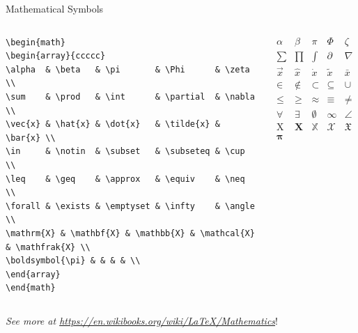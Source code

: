 \documentclass[aspectratio=1610]{beamer}
\let\oldfootnotesize\footnotesize
\renewcommand*{\footnotesize}{\oldfootnotesize\tiny}
\begin{document}
\begin{frame}[fragile]{Mathematical Symbols}
  \begin{columns}[T]

\begin{lrbox}{\mybox}%
    \begin{lstlisting}[basicstyle=\footnotesize\ttfamily\color{wcprimary}]
\begin{math}
\begin{array}{ccccc}
\alpha  & \beta   & \pi       & \Phi      & \zeta   \\
\sum    & \prod   & \int      & \partial  & \nabla  \\
\vec{x} & \hat{x} & \dot{x}   & \tilde{x} & \bar{x} \\
\in     & \notin  & \subset   & \subseteq & \cup    \\
\leq    & \geq    & \approx   & \equiv    & \neq    \\
\forall & \exists & \emptyset & \infty    & \angle  \\
\mathrm{X} & \mathbf{X} & \mathbb{X} & \mathcal{X}
& \mathfrak{X} \\
\boldsymbol{\pi} & & & & \\
\end{array}
\end{math}
    \end{lstlisting}
\end{lrbox}
\scalebox{1.2}{\usebox{\mybox}}

\begin{math}
\begin{array}{ccccc}
\alpha  & \beta   & \pi       & \Phi      & \zeta   \\
\sum    & \prod   & \int      & \partial  & \nabla  \\
\vec{x} & \hat{x} & \dot{x}   & \tilde{x} & \bar{x} \\
\in     & \notin  & \subset   & \subseteq & \cup    \\
\leq    & \geq    & \approx   & \equiv    & \neq    \\
\forall & \exists & \emptyset & \infty    & \angle  \\
\mathrm{X} & \mathbf{X} & \mathbb{X} & \mathcal{X}
& \mathfrak{X} \\
\boldsymbol{\pi} & & & & \\
\end{array}
\end{math}
  \end{columns}
  \vfill
{\small\it See more at \url{https://en.wikibooks.org/wiki/LaTeX/Mathematics}}!
\end{frame}
\end{document}
